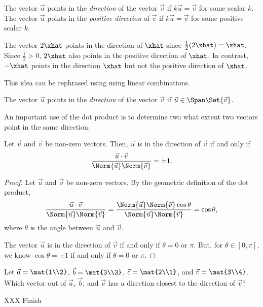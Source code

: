 \begin{definition}
	The vector $\vec u$ points in the \emph{direction} of
	the vector $\vec v$ if $k\vec u=\vec v$ for some scalar $k$.
	The vector $\vec u$ points in the \emph{positive direction} of
	$\vec v$ if $k\vec u=\vec v$ for some positive scalar $k$.
\end{definition}

The vector $2\xhat$ points in the direction of $\xhat$ since
$\frac{1}{2}(2\xhat)=\xhat$.  Since $\frac{1}{2}>0$, $2\xhat$ also points
in the positive direction of $\xhat$. In contrast, 
$-\xhat$ points in the direction $\xhat$ but not the positive direction of $\xhat$.

This idea can be rephrased using using linear combinations.
\begin{definition}
	The vector $\vec u$ points in the \emph{direction} of the vector $\vec v$
	if $\vec u\in\Span\Set{\vec v}$.
\end{definition}

An important use of the dot product is to determine two what extent two
vectors point in the same direction.

\begin{theorem}
	Let $\vec u$ and $\vec v$ be non-zero vectors. Then, $\vec u$ is in the direction
	of $\vec v$ if and only if 
	\[
		\frac{\vec u\cdot \vec v}{\Norm{\vec u}\Norm{\vec v}} = \pm 1.
	\]
\end{theorem}
\begin{proof}
	Let $\vec u$ and $\vec v$ be non-zero vectors.
	By the geometric definition of the dot product,
	\[
		\frac{\vec u\cdot \vec v}{\Norm{\vec u}\Norm{\vec v}} = \frac{\Norm{\vec u}\Norm{\vec v}\cos\theta}{\Norm{\vec u}\Norm{\vec v}}
		=\cos\theta,
	\]
	where $\theta$ is the angle between $\vec u$ and $\vec v$.

	The vector $\vec u$ is in the direction of $\vec v$ if and only if $\theta=0$ or $\pi$.
	But, for $\theta\in[0,\pi]$, we know $\cos\theta=\pm1$ if and only if $\theta=0$ or $\pi$.
\end{proof}

\begin{example}
	Let $\vec a=\mat{1\\2}$, $\vec b=\mat{3\\3}$, $\vec c=\mat{2\\1}$, and $\vec v=\mat{3\\4}$. Which vector out of
	$\vec a$, $\vec b$, and $\vec c$ has a direction closest to the direction of $\vec v$?

	XXX Finish
\end{example}


